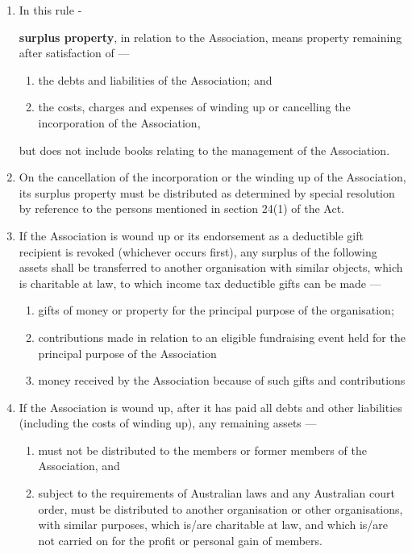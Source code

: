 \documentclass[../constitution.tex]{subfiles}
\begin{document}
\begin{enumerate}

  \item In this rule -

        \textbf{surplus property}, in relation to the Association, means property remaining after satisfaction of ---

        \begin{enumerate}
          \item the debts and liabilities of the Association; and
          \item the costs, charges and expenses of winding up or cancelling the incorporation of the Association,
        \end{enumerate}
        but does not include books relating to the management of the Association.
  \item On the cancellation of the incorporation or the winding up of the Association, its surplus property must be distributed as determined by special resolution by reference to the persons mentioned in section 24(1) of the Act.

  \item If the Association is wound up or its endorsement as a deductible gift recipient is revoked (whichever occurs first), any surplus of the following assets shall be transferred to another organisation with similar objects, which is charitable at law, to which income tax deductible gifts can be made ---
        \begin{enumerate}
          \item gifts of money or property for the principal purpose of the organisation;
          \item contributions made in relation to an eligible fundraising event held for the principal purpose of the Association
          \item money received by the Association because of such gifts and contributions
        \end{enumerate}
  \item If the Association is wound up, after it has paid all debts and other liabilities (including the costs of winding up), any remaining assets ---
        \begin{enumerate}
          \item must not be distributed to the members or former members of the Association, and
          \item subject to the requirements of Australian laws and any Australian court order, must be distributed to another organisation or other organisations, with similar purposes, which is/are charitable at law, and which is/are not carried on for the profit or personal gain of members.
        \end{enumerate}
\end{enumerate}
\end{document}
